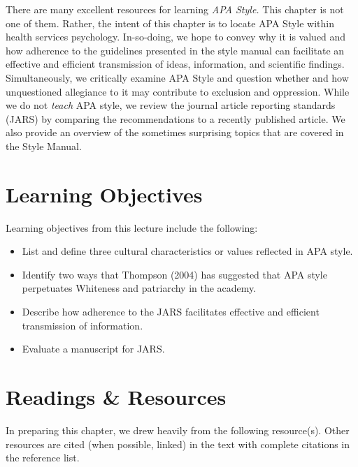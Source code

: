 \documentclass[
  11pt,
]{book}
\providecommand{\tightlist}{%
  \setlength{\itemsep}{0pt}\setlength{\parskip}{0pt}}
\begin{document}
There are many excellent resources for learning \emph{APA Style.} This chapter is not one of them. Rather, the intent of this chapter is to locate APA Style within health services psychology. In-so-doing, we hope to convey why it is valued and how adherence to the guidelines presented in the style manual can facilitate an effective and efficient transmission of ideas, information, and scientific findings. Simultaneously, we critically examine APA Style and question whether and how unquestioned allegiance to it may contribute to exclusion and oppression. While we do not \emph{teach} APA style, we review the journal article reporting standards (JARS) by comparing the recommendations to a recently published article. We also provide an overview of the sometimes surprising topics that are covered in the Style Manual.

\section{Learning Objectives}\label{learning-objectives-7}

Learning objectives from this lecture include the following:

\begin{itemize}
\tightlist
\item
  List and define three cultural characteristics or values reflected in APA style.
\item
  Identify two ways that Thompson (2004) has suggested that APA style perpetuates Whiteness and patriarchy in the academy.
\item
  Describe how adherence to the JARS facilitates effective and efficient transmission of information.
\item
  Evaluate a manuscript for JARS.
\end{itemize}

\section{Readings \& Resources}\label{readings-resources}

In preparing this chapter, we drew heavily from the following resource(s). Other resources are cited (when possible, linked) in the text with complete citations in the reference list.
\end{document}
